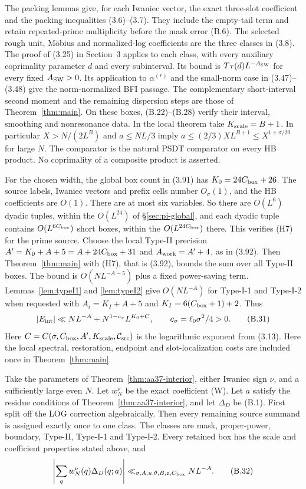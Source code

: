 The packing lemmas give, for each Iwaniec vector, the exact
three-slot coefficient and the packing inequalities (3.6)--(3.7).
They include the empty-tail term and retain repeated-prime
multiplicity before the mask error (B.6). The selected rough unit,
M\"obius and normalized-log coefficients are the three classes in
(3.8). The proof of (3.25) in Section~3 applies to each class, with
every auxiliary coprimality parameter $d$ and every subinterval.
Its bound is $T\tau(d)L^{-A_{\rm SW}}$ for every fixed
$A_{\rm SW}>0$. Its application to $\alpha^{(r)}$ and the small-norm
case in (3.47)--(3.48) give the norm-normalized BFI passage. The
complementary short-interval second moment and the remaining
dispersion steps are those of Theorem~\ref{thm:main}. On these boxes,
(B.22)--(B.28) verify their interval, smoothing and nonresonance data.
In the local theorem take $K_{\rm scale}=B+1$. In particular
$X>N/(2L^B)$ and $a\le NL/3$ imply
$a\le(2/3)XL^{B+1}\le X^{1+\sigma/20}$ for large $N$. The
comparator is the natural PSDT comparator on every HB product. No
coprimality of a composite product is asserted.

For the chosen width, the global box count in (3.91) has
$K_0=24C_{\rm box}+26$. The source labels, Iwaniec vectors and prefix
cells number $O_\sigma(1)$, and the HB coefficients are $O(1)$. There
are at most six variables. So there are $O(L^6)$ dyadic tuples, within
the $O(L^{24})$ of \S\ref{sec:pi-global}, and each dyadic tuple contains
$O(L^{6C_{\rm box}})$ short boxes, within the $O(L^{24C_{\rm box}})$ there.
This verifies (H7) for the prime source. Choose the local Type-II precision
$A'=K_0+A+5=A+24C_{\rm box}+31$ and
$A_{\rm work}=A'+4$, as in (3.92).
Then Theorem~\ref{thm:main} with (H7), that is (3.92), bounds the sum
over all Type-II boxes. The bound is $O(NL^{-A-5})$ plus a fixed
power-saving term. Lemmas~\ref{lem:typeI1}
and \ref{lem:typeI2} give $O(NL^{-A})$ for Type-I-1 and Type-I-2
when requested with $A_i=K_I+A+5$ and
$K_I=6(C_{\rm box}+1)+2$. Thus
\[
 |E_{\rm int}|\ll NL^{-A}
       +N^{1-c_\sigma}L^{K_0+C},
 \qquad c_\sigma=\ell_0\sigma^2/4>0.
 \tag{B.31}
\]
Here $C=C(\sigma,C_{\rm box},A',K_{\rm scale},\mathcal C_{\rm src})$
is the logarithmic exponent from (3.13).
Here the local spectral, restoration, endpoint and slot-localization
costs are included once in Theorem~\ref{thm:main}.

\begin{proposition}\label{prop:aa37-prime-source}
Take the parameters of Theorem~\ref{thm:aa37-interior}, either Iwaniec
sign $\nu$, and a sufficiently large even $N$. Let $w_N^\nu$ be
the exact coefficient (W). Let $a$ satisfy the residue conditions of
Theorem~\ref{thm:aa37-interior}, and let $\Delta_D$ be (B.1).
First split off the LOG correction algebraically. Then every remaining
source summand is assigned exactly once to one class. The classes are
mask, proper-power, boundary, Type-II, Type-I-1 and Type-I-2.
Every retained box has the scale and coefficient properties stated
above, and
\[
 \left|\sum_qw_N^\nu(q)\Delta_D(q;a)\right|
 \ll_{\sigma,A,u,\theta,B,\varepsilon,C_{\rm box}} NL^{-A}.
 \tag{B.32}
\]
\end{proposition}

